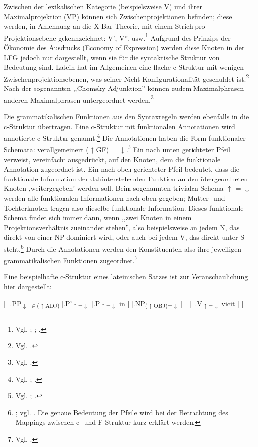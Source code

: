 \documentclass[12pt,a4paper]{article}
\begin{document}
Zwischen der lexikalischen Kategorie (beispielsweise V) und ihrer Maximalprojektion (VP) können sich Zwischenprojektionen befinden; diese werden, in Anlehnung an die X-Bar-Theorie, mit einem Strich pro Projektionsebene gekennzeichnet: V', V'', usw.\footnote{Vgl. \cite[15-6]{Rohrer}; \cite[56-7]{Dal}; \cite[5]{Skript}.} Aufgrund des Prinzips der Ökonomie des Ausdrucks (Economy of Expression) werden diese Knoten in der LFG jedoch nur dargestellt, wenn sie für die syntaktische Struktur von Bedeutung sind. Latein hat im Allgemeinen eine flache c-Struktur mit wenigen Zwischenprojektionsebenen, was seiner Nicht-Konfigurationalität geschuldet ist.\footnote{Vgl. \cite[46]{Rohrer}.} Nach der sogenannten ,,Chomsky-Adjunktion'' können zudem Maximalphrasen anderen Maximalphrasen untergeordnet werden.\footnote{Vgl. \cite[46; 57]{Dal}.}

Die grammatikalischen Funktionen aus den Syntaxregeln werden ebenfalls in die c-Struktur übertragen. Eine c-Struktur mit funktionalen Annotationen wird annotierte c-Struktur genannt.\footnote{Vgl. \cite[69]{Falk}; \cite[22]{Rohrer}.} Die Annotationen haben die Form funktionaler Schemata: verallgemeinert ($\uparrow$GF) = $\downarrow$.\footnote{Vgl. \cite[33]{Rohrer}; \cite[15-6]{Skript}.} Ein nach unten gerichteter Pfeil verweist, vereinfacht ausgedrückt, auf den Knoten, dem die funktionale Annotation zugeordnet ist. Ein nach oben gerichteter Pfeil bedeutet, dass die funktionale Information der dahinterstehenden Funktion an den übergeordneten Knoten ,weitergegeben' werden soll. Beim sogenannten trivialen Schema $\uparrow$ = $\downarrow$ werden alle funktionalen Informationen nach oben gegeben; Mutter- und Tochterknoten tragen also dieselbe funktionale Information. Dieses funktionale Schema findet sich immer dann, wenn ,,zwei Knoten in einem Projektionsverhältnis zueinander stehen'', also beispielsweise an jedem N, das direkt von einer NP dominiert wird, oder auch bei jedem V, das direkt unter S steht.\footnote{\cite[28]{Skript}; vgl. \cite[25; 33]{Rohrer}. Die genaue Bedeutung der Pfeile wird bei der Betrachtung des Mappings zwischen c- und F-Struktur kurz erklärt werden.} Durch die Annotationen werden den Konstituenten also ihre jeweiligen grammatikalischen Funktionen zugeordnet.\footnote{Vgl. \cite[28]{Skript}.}

Eine beispielhafte c-Struktur eines lateinischen Satzes ist zur Veranschaulichung hier dargestellt:

\begin{singlespace}
\Tree [.S 
		[.{NP\textsubscript{($\uparrow$OBJ)=$\downarrow$}}
			[.N\textsubscript{$\uparrow$=$\downarrow$} barbaros ]
		]							
		[.{PP\textsubscript{$\downarrow$ $\in$($\uparrow$ADJ)}}
			[.P'\textsubscript{$\uparrow$=$\downarrow$}						
				[.P\textsubscript{$\uparrow$=$\downarrow$} in ]
				[.{NP\textsubscript{($\uparrow$OBJ)=$\downarrow$}} ]
			]
        ] 	
        [.V\textsubscript{$\uparrow$=$\downarrow$} vicit ]						
	]
\end{singlespace}
\end{document}
